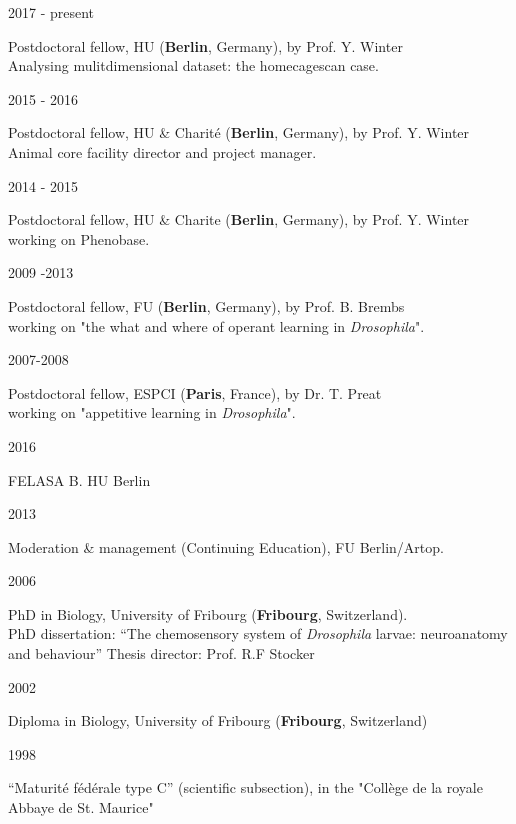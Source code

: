 %
\parbox{0.15\textwidth}{2017 - present}\hfill
\parbox[t]{0.83\textwidth}{Postdoctoral fellow,
       HU  (\textbf{Berlin}, Germany),
        by Prof. Y. Winter\\
        Analysing mulitdimensional dataset: the homecagescan case.}
%
\parbox{0.15\textwidth}{2015 - 2016}\hfill
\parbox[t]{0.83\textwidth}{Postdoctoral fellow,
       HU \& Charit\'e (\textbf{Berlin}, Germany),
        by Prof. Y. Winter\\
        Animal core facility director and project manager.}
\parbox{0.15\textwidth}{2014 - 2015}\hfill
\parbox[t]{0.83\textwidth}{Postdoctoral fellow,
       HU \& Charite (\textbf{Berlin}, Germany),
        by Prof. Y. Winter\\
        working on Phenobase.}
%
%
\parbox{0.15\textwidth}{2009 -2013}\hfill
\parbox[t]{0.83\textwidth}{Postdoctoral fellow,
       FU (\textbf{Berlin}, Germany),
        by Prof. B. Brembs\\
        working on "the what and where of operant learning in \textit{Drosophila}".}
                \parbox{0.15\textwidth}{2007-2008}\hfill
\parbox[t]{0.83\textwidth}{Postdoctoral fellow,
       ESPCI (\textbf{Paris}, France), by Dr. T. Preat\\
        working on "appetitive learning in \textit{Drosophila}".
        }
        
\parbox{0.15\textwidth}{2016}\hfill
\parbox[t]{0.83\textwidth}{FELASA B. HU Berlin
        }
\parbox{0.15\textwidth}{2013}\hfill
\parbox[t]{0.83\textwidth}{Moderation \& management (Continuing Education), FU Berlin/Artop.
        }
\parbox{0.15\textwidth}{2006}\hfill
\parbox[t]{0.83\textwidth}{PhD in Biology,
        University of Fribourg (\textbf{Fribourg}, Switzerland).\\
        PhD dissertation: ``The chemosensory system of \textit{Drosophila} larvae: neuroanatomy and behaviour''
        Thesis director: Prof. R.F Stocker}
\parbox{0.15\textwidth}{2002}\hfill
\parbox[t]{0.83\textwidth}{Diploma in Biology,
        University of Fribourg (\textbf{Fribourg}, Switzerland)
        }
\parbox{0.15\textwidth}{1998}\hfill
\parbox[t]{0.83\textwidth}{``Maturit\'e f\'ed\'erale type C'' (scientific subsection),
in the "Coll\`ege de la royale Abbaye de St. Maurice"}

